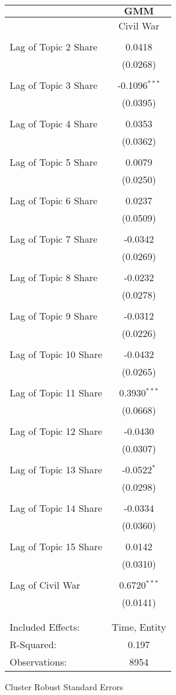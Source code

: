 \begin{center}
\begin{tabular}{lc}
\\[-1.8ex]\hline
& $\textbf{GMM}$\\
 \hline \hline 
& \multicolumn{1}{c}{Civil War} \\
\hline \\[-1.8ex]
Lag of Topic 2 Share & 0.0418 \\
 & (0.0268)\\ 
\\Lag of Topic 3 Share & -0.1096$^{***}$ \\
 & (0.0395)\\ 
\\Lag of Topic 4 Share & 0.0353 \\
 & (0.0362)\\ 
\\Lag of Topic 5 Share & 0.0079 \\
 & (0.0250)\\ 
\\Lag of Topic 6 Share & 0.0237 \\
 & (0.0509)\\ 
\\Lag of Topic 7 Share & -0.0342 \\
 & (0.0269)\\ 
\\Lag of Topic 8 Share & -0.0232 \\
 & (0.0278)\\ 
\\Lag of Topic 9 Share & -0.0312 \\
 & (0.0226)\\ 
\\Lag of Topic 10 Share & -0.0432 \\
 & (0.0265)\\ 
\\Lag of Topic 11 Share & 0.3930$^{***}$ \\
 & (0.0668)\\ 
\\Lag of Topic 12 Share & -0.0430 \\
 & (0.0307)\\ 
\\Lag of Topic 13 Share & -0.0522$^{*}$ \\
 & (0.0298)\\ 
\\Lag of Topic 14 Share & -0.0334 \\
 & (0.0360)\\ 
\\Lag of Topic 15 Share & 0.0142 \\
 & (0.0310)\\ 
\\Lag of Civil War & 0.6720$^{***}$ \\
 & (0.0141)\\ 
\hline \\[-1.8ex]
 \\ Included Effects:  & Time, Entity\\ R-Squared:  & 0.197\\ Observations:  & 8954\end{tabular}
\end{center}Cluster Robust Standard Errors